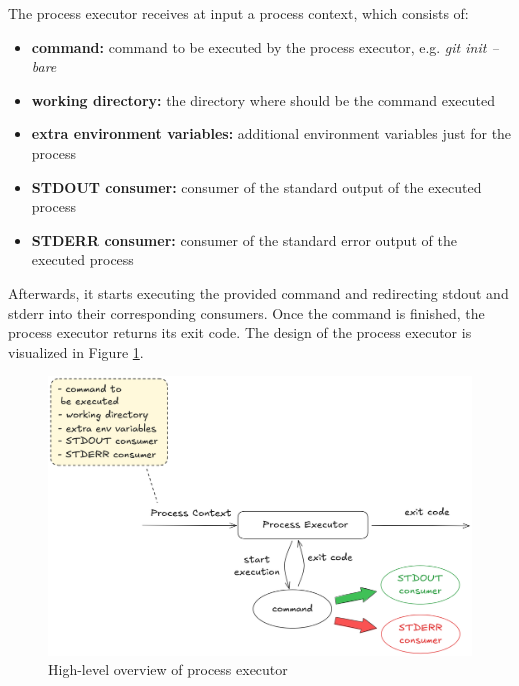 \documentclass[../main.tex]{subfiles}
\begin{document}
The process executor receives at input a process context, which consists of:
\begin{itemize}
    \item \textbf{command:} command to be executed by the process executor, e.g. \textit{git init --bare}

    \item \textbf{working directory:} the directory where should be the command executed

    \item \textbf{extra environment variables:} additional environment variables just for the process

    \item \textbf{STDOUT consumer:} consumer of the standard output of the executed process

    \item \textbf{STDERR consumer:} consumer of the standard error output of the executed process
\end{itemize}

Afterwards, it starts executing the provided command and redirecting stdout and stderr into their corresponding consumers. Once the command is finished, the process executor returns its exit code. The design of the process executor is visualized in Figure \ref{fig:process-executor}.

\begin{figure}
  \begin{center}
    \includegraphics[width=\textwidth]{images/process-executor.png}
  \end{center}
  \caption{High-level overview of process executor}
  \label{fig:process-executor}
\end{figure}
\end{document}
